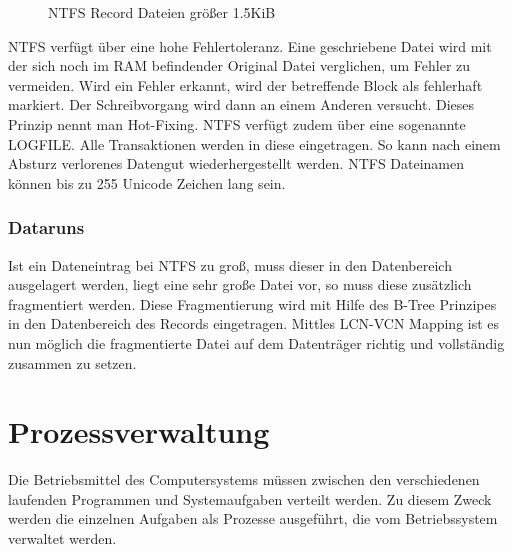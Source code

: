 \documentclass[12pt,a4paper]{article}
\begin{document}
	\begin{figure}[h]
	\centering
	\caption{NTFS Record Dateien größer 1.5KiB}
	\end{figure}\newpage
\noindent NTFS verfügt über eine hohe Fehlertoleranz. Eine geschriebene Datei wird mit der sich noch im RAM befindender Original Datei verglichen, um Fehler zu vermeiden. Wird ein Fehler erkannt, wird der betreffende Block als fehlerhaft markiert. Der Schreibvorgang wird dann an einem Anderen versucht. Dieses Prinzip nennt man Hot-Fixing. NTFS verfügt zudem über eine sogenannte LOGFILE. Alle Transaktionen werden in diese eingetragen. So kann nach einem Absturz verlorenes Datengut wiederhergestellt werden. NTFS Dateinamen können bis zu 255 Unicode Zeichen lang sein. 

\subsubsection{Dataruns}
Ist ein Dateneintrag bei NTFS zu groß, muss dieser in den Datenbereich ausgelagert werden, liegt eine sehr große Datei vor, so muss diese zusätzlich fragmentiert werden. Diese Fragmentierung wird mit Hilfe des B-Tree Prinzipes in den Datenbereich des Records eingetragen. Mittles LCN-VCN Mapping ist es nun möglich die fragmentierte Datei auf dem Datenträger richtig und vollständig zusammen zu setzen.

\section{Prozessverwaltung}
Die Betriebsmittel des Computersystems müssen zwischen den verschiedenen laufenden Programmen und Systemaufgaben verteilt werden. Zu diesem Zweck werden die einzelnen Aufgaben als Prozesse ausgeführt, die vom Betriebssystem verwaltet werden.
\end{document}
